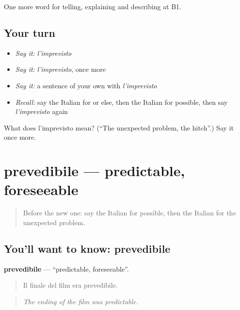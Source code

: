 \begin{grammarlens}[title={What you've built}]
One more word for telling, explaining and describing at B1.
\end{grammarlens}

\subsection*{Your turn}
\begin{itemize}
\raggedright
  \item \emph{Say it:} \emph{l'imprevisto}
  \item \emph{Say it:} \emph{l'imprevisto}, once more
  \item \emph{Say it:} a sentence of your own with \emph{l'imprevisto}
  \item \emph{Recall:} say the Italian for or else, then the Italian for possible, then say \emph{l'imprevisto} again
\end{itemize}

\begin{tcolorbox}[breakable,colback=teal!4,colframe=teal!35!black,title={Before you move on}]
What does l'imprevisto mean? (\textquotedblleft{}The unexpected problem, the hitch\textquotedblright{}.) Say it once more.
\end{tcolorbox}
\section[prevedibile]{prevedibile — predictable, foreseeable}

\label{lesson:IT-C374-prevedibile}



\begin{quote}
Before the new one: say the Italian for possible, then the Italian for the unexpected problem.
\end{quote}

\subsection*{You'll want to know: prevedibile}
\textbf{prevedibile} — \textquotedblleft{}predictable, foreseeable\textquotedblright{}.

\begin{quote}
Il finale del film era prevedibile.
\end{quote}

\begin{quote}
\emph{The ending of the film was predictable.}
\end{quote}

